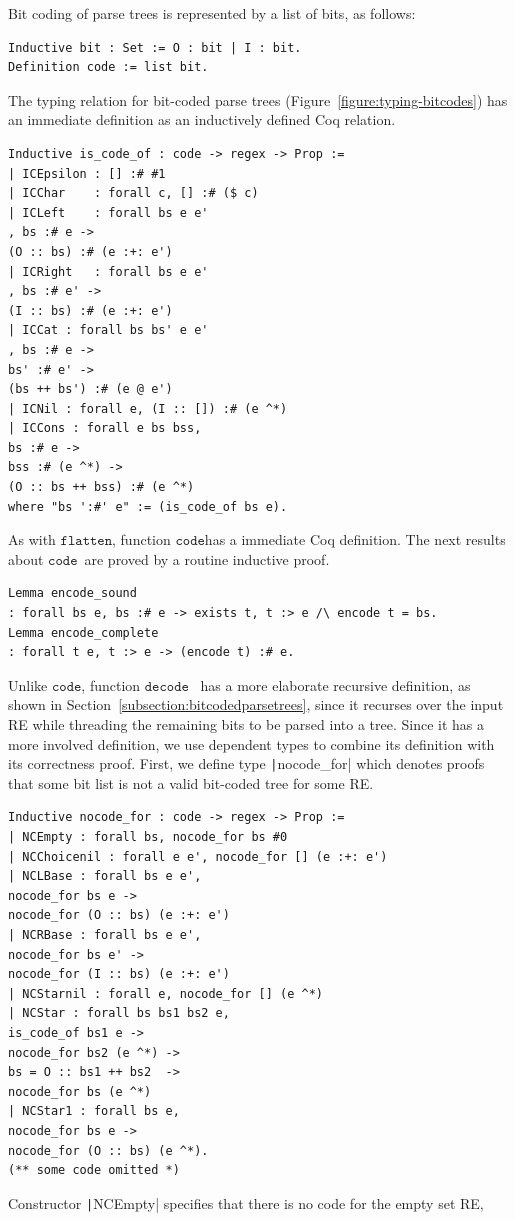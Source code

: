 \documentclass[oneside,12pt]{scrbook}
\theoremstyle{definition}
\newcommand{\flatten}{\ensuremath{\texttt{flatten}}}
\newcommand{\code}{\ensuremath{\texttt{code}}}
\newcommand{\decodee}{\ensuremath{\texttt{decode}}}
\newcommand{\coq}[1]{\texttt|#1|}
\theoremstyle{plain}
\theoremstyle{definition}
\begin{document}
Bit coding of parse trees is represented by a list of bits, as follows:
\begin{verbatim}
Inductive bit : Set := O : bit | I : bit.
Definition code := list bit.
\end{verbatim}
The typing relation for bit-coded parse trees
(Figure~\ref{figure:typing-bitcodes}) has an immediate definition as an
inductively defined Coq relation.
\begin{verbatim}
Inductive is_code_of : code -> regex -> Prop :=
| ICEpsilon : [] :# #1
| ICChar    : forall c, [] :# ($ c)
| ICLeft    : forall bs e e'
, bs :# e ->
(O :: bs) :# (e :+: e')
| ICRight   : forall bs e e'
, bs :# e' ->
(I :: bs) :# (e :+: e')
| ICCat : forall bs bs' e e'
, bs :# e ->
bs' :# e' ->
(bs ++ bs') :# (e @ e')
| ICNil : forall e, (I :: []) :# (e ^*)
| ICCons : forall e bs bss, 
bs :# e -> 
bss :# (e ^*) -> 
(O :: bs ++ bss) :# (e ^*) 
where "bs ':#' e" := (is_code_of bs e).
\end{verbatim}
As with \flatten, function \code has a immediate Coq definition. The next
results about \code~are proved by a routine inductive proof.
\begin{verbatim}
Lemma encode_sound
: forall bs e, bs :# e -> exists t, t :> e /\ encode t = bs.
Lemma encode_complete
: forall t e, t :> e -> (encode t) :# e.   
\end{verbatim}
Unlike \code, function \decodee~ has a more elaborate recursive definition, as
shown in Section~\ref{subsection:bitcodedparsetrees}, since it recurses over the
input RE while threading the remaining bits to be parsed into a tree. Since it
has a more involved definition, we use dependent types to combine its definition
with its correctness proof. First, we define type \coq{nocode_for} which
denotes proofs that some bit list is not a valid bit-coded tree for some RE.
\begin{verbatim}
Inductive nocode_for : code -> regex -> Prop :=
| NCEmpty : forall bs, nocode_for bs #0
| NCChoicenil : forall e e', nocode_for [] (e :+: e')
| NCLBase : forall bs e e', 
nocode_for bs e -> 
nocode_for (O :: bs) (e :+: e')
| NCRBase : forall bs e e', 
nocode_for bs e' -> 
nocode_for (I :: bs) (e :+: e')
| NCStarnil : forall e, nocode_for [] (e ^*)
| NCStar : forall bs bs1 bs2 e,
is_code_of bs1 e ->
nocode_for bs2 (e ^*) ->
bs = O :: bs1 ++ bs2  ->
nocode_for bs (e ^*)
| NCStar1 : forall bs e,
nocode_for bs e ->
nocode_for (O :: bs) (e ^*).
(** some code omitted *)
\end{verbatim}
Constructor \coq{NCEmpty} specifies that there is no code for the empty set RE,
\end{document}
